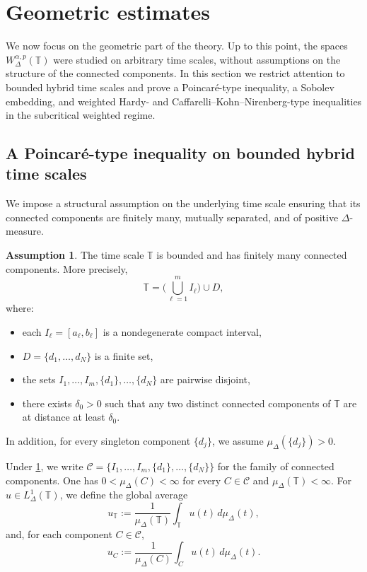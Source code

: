 \documentclass[11pt,a4paper]{article}
\numberwithin{equation}{section}
\theoremstyle{definition}
\newtheorem{assumption}[assumption]{Assumption}
\newcommand{\T}{\mathbb{T}}
\begin{document}

\section{Geometric estimates}
\label{sec:geometry}

We now focus on the geometric part of the theory. Up to this point,
the spaces $W^{\alpha,p}_\Delta(\T)$ were studied on arbitrary time scales,
without assumptions on the structure of the connected components. In this section
we restrict attention to bounded hybrid time scales and prove a Poincar\'e-type
inequality, a Sobolev embedding, and weighted Hardy- and
Caffarelli--Kohn--Nirenberg-type inequalities in the subcritical weighted regime.

\subsection{A Poincar\'e-type inequality on bounded hybrid time scales}\label{subsec:poincare}

We impose a structural assumption on the underlying time scale ensuring that
its connected components are finitely many, mutually separated, and of
positive $\Delta$-measure.

\begin{assumption}\label{ass:hybrid-class}
The time scale $\T$ is bounded and has finitely many connected components.
More precisely,
\[
\T=\Big(\bigcup_{\ell=1}^m I_\ell\Big)\cup D,
\]
where:
\begin{itemize}
\item each $I_\ell=[a_\ell,b_\ell]$ is a nondegenerate compact interval,
\item $D=\{d_1,\dots,d_N\}$ is a finite set,
\item the sets $I_1,\dots,I_m,\{d_1\},\dots,\{d_N\}$ are pairwise disjoint,
\item there exists $\delta_0>0$ such that any two distinct connected
      components of $\T$ are at distance at least $\delta_0$.
\end{itemize}
In addition, for every singleton component $\{d_j\}$, we assume
$\mu_\Delta(\{d_j\})>0$.
\end{assumption}

Under \cref{ass:hybrid-class}, we write
$\mathcal C=\{I_1,\dots,I_m,\{d_1\},\dots,\{d_N\}\}$ for the family of
connected components. One has $0<\mu_\Delta(C)<\infty$ for every
$C\in\mathcal C$ and $\mu_\Delta(\T)<\infty$. For $u\in L_\Delta^1(\T)$,
we define the global average
\[
u_{\T}:=\frac1{\mu_\Delta(\T)}\int_{\T} u(t)\,d\mu_\Delta(t),
\]
and, for each component $C\in\mathcal C$,
\[
u_C:=\frac1{\mu_\Delta(C)}\int_C u(t)\,d\mu_\Delta(t).
\]
\end{document}
